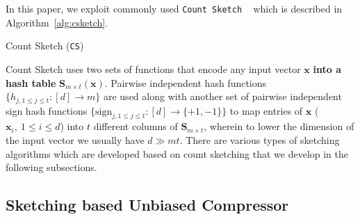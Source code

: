 \documentclass[twoside]{article}
\begin{document}
In this paper, we exploit commonly used \texttt{Count Sketch} ~\cite{DBLP:journals/tcs/CharikarCF04} which is described in Algorithm~\ref{alg:csketch}.
\begin{algorithm}[H]
\caption{Count Sketch ({\texttt{CS})~\cite{DBLP:journals/tcs/CharikarCF04}} }\label{alg:csketch}
\begin{algorithmic}[1]
\end{algorithmic}
\end{algorithm}
Count Sketch uses two sets of functions that encode any input vector $\boldsymbol{x}$ \textbf{into a hash table} $\boldsymbol{S}_{m\times t}(\boldsymbol{x})$. 
Pairwise independent hash functions $\{h_{j,1\leq j\leq t }:[d]\rightarrow m\}$ are used along with another set of pairwise independent sign hash functions $\{\text{sign}_{j,1\leq j\leq t}: [d]\rightarrow \{+1,-1\}\}$ to map entries of $\boldsymbol{x}$ ($\boldsymbol{x}_i, \:1\leq i\leq d$) into $t$ different columns of $\mathbf{S}_{m\times t}$, wherein to lower the dimension of the input vector we usually have $d\gg mt$.  
There are various types of sketching algorithms which are developed based on count sketching that we develop in the following subsections.   

\vspace{-0.05in}
\subsection{Sketching based Unbiased Compressor}
\vspace{-0.05in}
\end{document}
